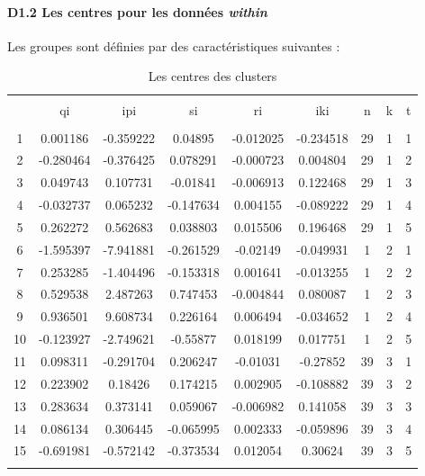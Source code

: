 \documentclass[11pt,]{article}
\let\oldparagraph\paragraph
\renewcommand{\paragraph}[1]{\oldparagraph{#1}\mbox{}}
\begin{document}
\FloatBarrier

\hypertarget{d1.2-les-centres-pour-les-donnees-within}{%
\paragraph{\texorpdfstring{D1.2 Les centres pour les données
\emph{within}}{D1.2 Les centres pour les données within}}\label{d1.2-les-centres-pour-les-donnees-within}}

Les groupes sont définies par des caractéristiques suivantes :

\FloatBarrier

\begin{table}[!htbp] \centering 
  \caption{Les centres des clusters} 
  \label{} 
\begin{tabular}{@{\extracolsep{5pt}} ccccccccc} 
\\[-1.8ex]\hline 
\hline \\[-1.8ex] 
 & qi & ipi & si & ri & iki & n & k & t \\ 
\hline \\[-1.8ex] 
1 & 0.001186 & -0.359222 & 0.04895 & -0.012025 & -0.234518 & 29 & 1 & 1 \\ 
2 & -0.280464 & -0.376425 & 0.078291 & -0.000723 & 0.004804 & 29 & 1 & 2 \\ 
3 & 0.049743 & 0.107731 & -0.01841 & -0.006913 & 0.122468 & 29 & 1 & 3 \\ 
4 & -0.032737 & 0.065232 & -0.147634 & 0.004155 & -0.089222 & 29 & 1 & 4 \\ 
5 & 0.262272 & 0.562683 & 0.038803 & 0.015506 & 0.196468 & 29 & 1 & 5 \\ 
6 & -1.595397 & -7.941881 & -0.261529 & -0.02149 & -0.049931 & 1 & 2 & 1 \\ 
7 & 0.253285 & -1.404496 & -0.153318 & 0.001641 & -0.013255 & 1 & 2 & 2 \\ 
8 & 0.529538 & 2.487263 & 0.747453 & -0.004844 & 0.080087 & 1 & 2 & 3 \\ 
9 & 0.936501 & 9.608734 & 0.226164 & 0.006494 & -0.034652 & 1 & 2 & 4 \\ 
10 & -0.123927 & -2.749621 & -0.55877 & 0.018199 & 0.017751 & 1 & 2 & 5 \\ 
11 & 0.098311 & -0.291704 & 0.206247 & -0.01031 & -0.27852 & 39 & 3 & 1 \\ 
12 & 0.223902 & 0.18426 & 0.174215 & 0.002905 & -0.108882 & 39 & 3 & 2 \\ 
13 & 0.283634 & 0.373141 & 0.059067 & -0.006982 & 0.141058 & 39 & 3 & 3 \\ 
14 & 0.086134 & 0.306445 & -0.065995 & 0.002333 & -0.059896 & 39 & 3 & 4 \\ 
15 & -0.691981 & -0.572142 & -0.373534 & 0.012054 & 0.30624 & 39 & 3 & 5 \\ 
\hline \\[-1.8ex] 
\end{tabular} 
\end{table}
\end{document}
